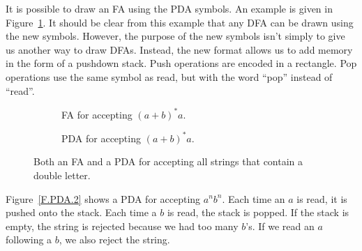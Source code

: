 \documentclass[letterpaper,12pt,openany,reqno]{book}%
\newcommand{\fanonterminalnode}[2] {\node at (#1) (#2) [circle, draw, minimum size=24pt] {#2};}
\newcommand{\faarctransition}[5] {\draw [->] (#1) to[out=#4, in=#5] node  [midway, above] {#3} (#2) ;}
\newcommand{\faloopright}[2] {\draw (#1) edge [loop right] node {#2} ();}
\newcommand{\faloopleft}[2] {\path (#1) edge [loop left] node {#2} ();}
\newcommand{\pdaterminal}[3] {\node at (#1) (#2) [rectangle, draw, rounded corners] {#3};}
\newcommand{\pdaread}[3] {\node at (#1) (#2) [diamond, draw] {#3}; }
\newcommand{\pdatransition}[3] {\draw [->] (#1) -- (#2) node [midway, above] {#3};}
\newcommand{\pdaxthree}[4] {\draw [->] (#1) -- (#2) node [midway, above] {#4} -- (#3) ;}
\newcommand{\pdaxfour}[5] {\draw [->] (#1) -- (#2) node [midway, above] {#5} -- (#3) -- (#4);}
\newcommand{\pdarighttransition}[3] {\draw [->] (#1) -- (#2) node [midway, right] {#3};}
\begin{document}
It is possible to draw an FA using the PDA symbols. An example is given in Figure~\ref{F.PDA.1}. It should be clear from this example that any DFA can be drawn using the new symbols. However, the purpose of the new symbols isn't simply to give us another way to draw DFAs. Instead, the new format allows us to add memory in the form of a pushdown stack. Push operations are encoded in a rectangle. Pop operations use the same symbol as read, but with the word ``pop'' instead of ``read''.
\begin{figure}[htbp]
\centering
\begin{subfigure}[b]{0.45\textwidth}
\centering
{}
 \caption{FA for accepting $(a+b)^*a$.}
\end{subfigure}

\begin{subfigure}[b]{0.45\textwidth}
\centering
{}
 \caption{PDA for accepting $(a+b)^*a$.}
\end{subfigure}

\caption{Both an FA and a PDA for accepting all strings that contain a double letter.}
\label{F.PDA.1}
\end{figure}

Figure~\ref{F.PDA.2} shows a PDA for accepting $a^nb^n$. Each time an $a$ is read, it is pushed onto the stack. Each time a $b$ is read, the stack is popped. If the stack is empty, the string is rejected because we had too many $b$'s. If we read an $a$ following a $b$, we also reject the string.
\end{document}
